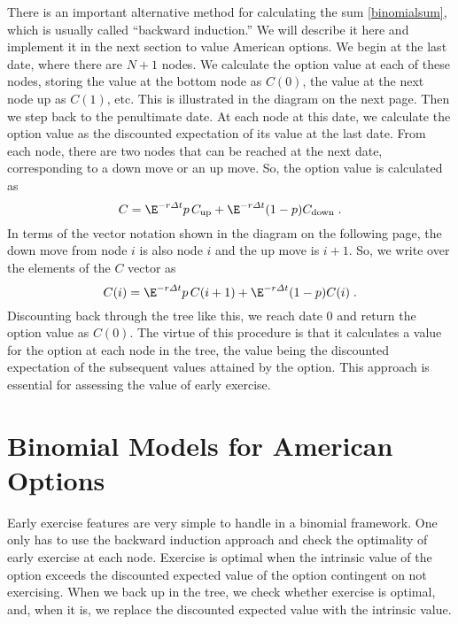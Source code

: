There is an important alternative method for calculating the sum \eqref{binomialsum}, which is usually called ``backward induction.''   We will describe it here and implement it in the next section to value American options.  We begin at the last date, where there are $N+1$ nodes.   We calculate the option value at each of these nodes, storing the value at the bottom node as $C(0)$, the value at the next node up as $C(1)$, etc.  This is illustrated in the diagram on the next page.  Then we step back to the penultimate date.  At each node at this date, we calculate the option value as the discounted expectation of its value at the last date.  From each node, there are two nodes that can be reached at the next date, corresponding to a down move or an up move.  So, the option value is calculated as
\begin{equation}\label{binomial001}
C = \E^{-r\varDelta t}p\,C_{\text{up}} + \E^{-r\varDelta t}(1-p)C_{\text{down}}\;.
\end{equation}
In terms of the vector notation shown in the diagram on the following page, the down move from node $i$ is also node $i$ and the up move is $i+1$.  So, we write over the elements of the $C$ vector as
\begin{equation}\label{binomial002}
C(i) = \E^{-r\varDelta t}p\,C(i+1) + \E^{-r\varDelta t}(1-p)C(i)\;.
\end{equation}
Discounting back through the tree like this, we reach date 0 and return the option value as $C(0)$.  The virtue of this procedure is that it calculates a value for the option at each node in the tree, the value being the discounted expectation of the subsequent values attained by the option.  This approach is essential for assessing the value of early exercise.

\section{Binomial Models for American Options}

Early exercise  features are very simple to handle in a binomial framework.  One only has to use the backward induction approach and check the optimality of early exercise at each node.  Exercise is optimal when the intrinsic value of the option exceeds the discounted expected value of the option contingent on not exercising.  When we back up in the tree, we check whether exercise is optimal, and, when it is, we replace the discounted expected value with the intrinsic value.  


